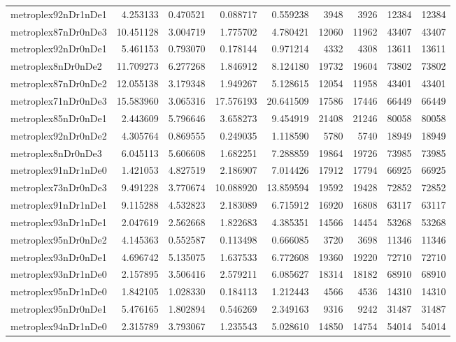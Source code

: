 \begin{longtable}{|l|r|r|r|r|r|r|r|r|}
metroplex92nDr1nDe1 & 4.253133 & 0.470521 & 0.088717 & 0.559238 & 3948 & 3926 & 12384 & 12384 \\
metroplex87nDr0nDe3 & 10.451128 & 3.004719 & 1.775702 & 4.780421 & 12060 & 11962 & 43407 & 43407 \\
metroplex92nDr0nDe1 & 5.461153 & 0.793070 & 0.178144 & 0.971214 & 4332 & 4308 & 13611 & 13611 \\
metroplex8nDr0nDe2 & 11.709273 & 6.277268 & 1.846912 & 8.124180 & 19732 & 19604 & 73802 & 73802 \\
metroplex87nDr0nDe2 & 12.055138 & 3.179348 & 1.949267 & 5.128615 & 12054 & 11958 & 43401 & 43401 \\
metroplex71nDr0nDe3 & 15.583960 & 3.065316 & 17.576193 & 20.641509 & 17586 & 17446 & 66449 & 66449 \\
metroplex85nDr0nDe1 & 2.443609 & 5.796646 & 3.658273 & 9.454919 & 21408 & 21246 & 80058 & 80058 \\
metroplex92nDr0nDe2 & 4.305764 & 0.869555 & 0.249035 & 1.118590 & 5780 & 5740 & 18949 & 18949 \\
metroplex8nDr0nDe3 & 6.045113 & 5.606608 & 1.682251 & 7.288859 & 19864 & 19726 & 73985 & 73985 \\
metroplex91nDr1nDe0 & 1.421053 & 4.827519 & 2.186907 & 7.014426 & 17912 & 17794 & 66925 & 66925 \\
metroplex73nDr0nDe3 & 9.491228 & 3.770674 & 10.088920 & 13.859594 & 19592 & 19428 & 72852 & 72852 \\
metroplex91nDr1nDe1 & 9.115288 & 4.532823 & 2.183089 & 6.715912 & 16920 & 16808 & 63117 & 63117 \\
metroplex93nDr1nDe1 & 2.047619 & 2.562668 & 1.822683 & 4.385351 & 14566 & 14454 & 53268 & 53268 \\
metroplex95nDr0nDe2 & 4.145363 & 0.552587 & 0.113498 & 0.666085 & 3720 & 3698 & 11346 & 11346 \\
metroplex93nDr0nDe1 & 4.696742 & 5.135075 & 1.637533 & 6.772608 & 19360 & 19220 & 72710 & 72710 \\
metroplex93nDr1nDe0 & 2.157895 & 3.506416 & 2.579211 & 6.085627 & 18314 & 18182 & 68910 & 68910 \\
metroplex95nDr1nDe0 & 1.842105 & 1.028330 & 0.184113 & 1.212443 & 4566 & 4536 & 14310 & 14310 \\
metroplex95nDr0nDe1 & 5.476165 & 1.802894 & 0.546269 & 2.349163 & 9316 & 9242 & 31487 & 31487 \\
metroplex94nDr1nDe0 & 2.315789 & 3.793067 & 1.235543 & 5.028610 & 14850 & 14754 & 54014 & 54014 \\

\end{longtable}
